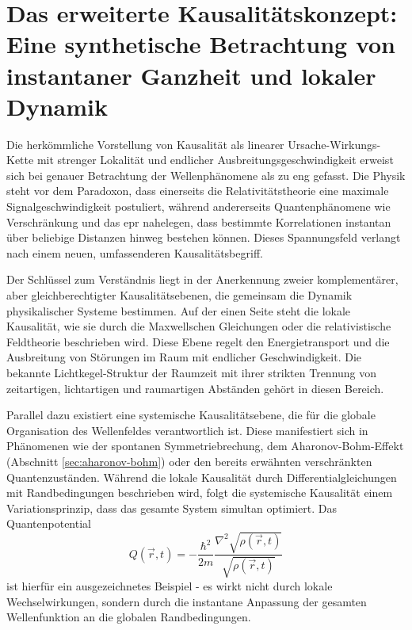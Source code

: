 \section{Das erweiterte Kausalitätskonzept: Eine synthetische Betrachtung von instantaner Ganzheit und lokaler Dynamik}
Die herkömmliche Vorstellung von Kausalität als linearer Ursache-Wirkungs-Kette mit strenger Lokalität und endlicher Ausbreitungsgeschwindigkeit erweist sich bei genauer Betrachtung
der Wellenphänomene als zu eng gefasst. Die Physik steht vor dem Paradoxon, dass einerseits die Relativitätstheorie eine maximale Signalgeschwindigkeit postuliert, während andererseits
Quantenphänomene wie Verschränkung und das \gls{epr} \cite{EPR1935} nahelegen, dass bestimmte Korrelationen instantan über beliebige Distanzen hinweg bestehen können. Dieses Spannungsfeld verlangt
nach einem neuen, umfassenderen Kausalitätsbegriff.

Der Schlüssel zum Verständnis liegt in der Anerkennung zweier komplementärer, aber gleichberechtigter Kausalitätsebenen, die gemeinsam die Dynamik physikalischer Systeme bestimmen.
Auf der einen Seite steht die lokale Kausalität, wie sie durch die Maxwellschen Gleichungen oder die relativistische Feldtheorie beschrieben wird. Diese Ebene regelt den Energietransport
und die Ausbreitung von Störungen im Raum mit endlicher Geschwindigkeit. Die bekannte Lichtkegel-Struktur der Raumzeit mit ihrer strikten Trennung von zeitartigen, lichtartigen und
raumartigen Abständen gehört in diesen Bereich.

Parallel dazu existiert eine systemische Kausalitätsebene, die für die globale Organisation des Wellenfeldes verantwortlich ist. Diese manifestiert sich in Phänomenen wie der
spontanen Symmetriebrechung, dem Aharonov-Bohm-Effekt (Abschnitt \ref{sec:aharonov-bohm}) oder den bereits erwähnten verschränkten Quantenzuständen. Während die lokale Kausalität durch Differentialgleichungen mit
Randbedingungen beschrieben wird, folgt die systemische Kausalität einem Variationsprinzip, dass das gesamte System simultan optimiert.
Das Quantenpotential \cite{bohm1952}
\begin{equation}
    \label{eq:bohm_potenzial}
    Q(\vec{r},t) = -\frac{\hbar^2}{2m} \frac{\nabla^2 \sqrt{\rho(\vec{r},t)}}{\sqrt{\rho(\vec{r},t)}}
\end{equation}
ist hierfür ein ausgezeichnetes Beispiel - es wirkt nicht durch lokale Wechselwirkungen, sondern durch die instantane Anpassung der gesamten
Wellenfunktion an die globalen Randbedingungen.

